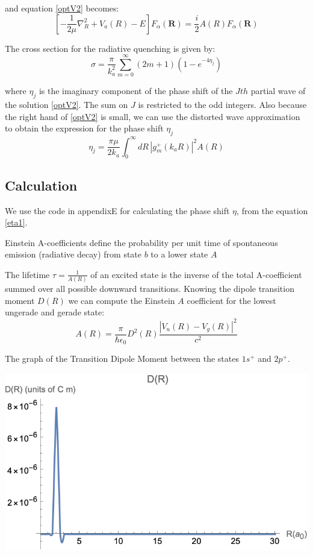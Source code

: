 and equation \eqref{optV2} becomes:
\begin{equation}\label{optApprox1}
\left[-\frac{1}{2\mu}\nabla_R^2 + V_a(R) - E\right]F_{\alpha}(\mathbf{R}) = \frac{i}{2}A(R)F_{\alpha}(\mathbf{R})
\end{equation}

The cross section for the radiative quenching is given by:
\begin{equation}
\sigma = \frac{\pi}{k_a^2}\sum_{m=0}^{\infty}{(2m+1)\left(1-e^{-4\eta_j}\right) }
\end{equation}

where $ \eta_j $ is the imaginary component of the phase shift of the $ Jth $ partial wave of the solution \eqref{optV2}. The sum on $ J $ is restricted to the odd integers. 
Also because the right hand of \eqref{optV2} is small, we can use the distorted wave approximation to obtain the expression for the phase shift $ \eta_j $
\begin{equation}\label{eta1}
\eta_j = \frac{\pi\mu}{2k_a}\int_0^{\infty}{dR\,\left|g_m^{+}\left(k_aR\right)\right|^2A(R) }
\end{equation}

\subsection{Calculation} \label{QuenchingCalculation}

We use the code in appendixE for calculating the phase shift $ \eta $, from the equation \eqref{eta1}.

Einstein A-coefficients define the probability per unit time of spontaneous emission (radiative decay) from state $ b $ to a lower state $ A $

The lifetime $ \tau = \frac{1}{A(R)} $ of an excited state is the inverse of the total A-coefficient summed over all possible downward transitions.
Knowing the dipole transition moment $ D(R) $ we can compute the Einstein $ A $ coefficient for the lowest ungerade and gerade state:
\begin{equation}
  A(R) = \frac{\pi}{\hbar\epsilon_0}D^2(R)\frac{\left|V_u(R) - V_g(R)\right|^2}{c^2}
\end{equation}

The graph of the Transition Dipole Moment between the states $ 1s^{+} $ and $ 2p^{+} $.

\includegraphics{DR-SI.png}

